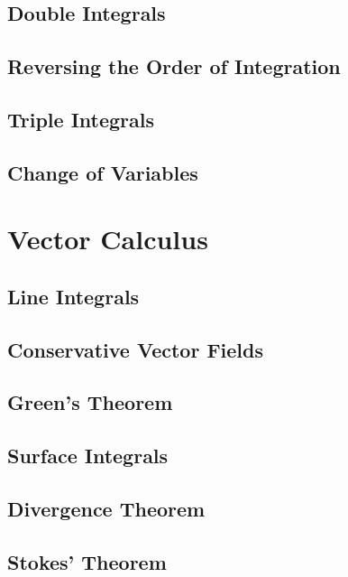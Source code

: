 \documentclass[12pt]{article}
\begin{document}
\subsection{Double Integrals}

\subsection{Reversing the Order of Integration}

\subsection{Triple Integrals} %

\subsection{Change of Variables}

\section{Vector Calculus} %

\subsection{Line Integrals}

\subsection{Conservative Vector Fields}

\subsection{Green's Theorem}

\subsection{Surface Integrals}

\subsection{Divergence Theorem}

\subsection{Stokes' Theorem}
\end{document}
